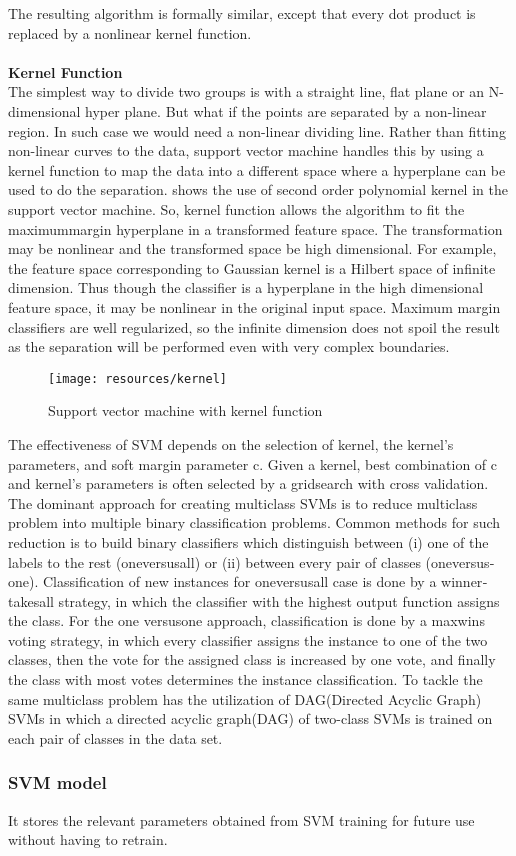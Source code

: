 The resulting algorithm is formally similar, except that every dot product is replaced by a nonlinear kernel 
function.\\
\\
\textbf{Kernel Function}\\
The simplest way to divide two groups is with a straight line, flat plane or an N-dimensional hyper plane.
But what if the points are separated by a non-linear region. In such case we would need a non-linear dividing line. Rather than fitting
non-linear curves to the data, support vector machine handles this by using a kernel function to map the data into a different space where
a hyperplane can be used to do the separation. \cite{Anglade2010} shows the use of second order polynomial kernel in the support vector machine.
So, kernel function allows the algorithm to fit the maximum­margin hyperplane in a transformed
feature space. The transformation may be nonlinear and the transformed space be high dimensional. For example, the 
feature space corresponding to Gaussian kernel is a Hilbert space of infinite dimension. Thus though the 
classifier is a hyperplane in the high dimensional feature space, it may be nonlinear in the original input 
space. Maximum margin classifiers are well regularized, so the infinite dimension does not spoil the 
result as the separation will be performed even with very complex boundaries.\\

\begin{figure}[h!]
        \texttt{[image: resources/kernel]}
        \caption{Support vector machine with kernel function}
\end{figure}
\vspace{15mm}
The effectiveness of SVM depends on the selection of kernel, the kernel’s parameters, and soft 
margin parameter c. Given a kernel, best combination of c and kernel’s parameters is often selected by a 
grid­search with cross validation. 
The dominant approach for creating multiclass SVMs is to reduce multi­class problem into 
multiple binary classification problems. Common methods for such reduction is to build binary classifiers 
which distinguish between (i) one of the labels to the rest (one­versus­all) or (ii) between every pair of 
classes (one­versus­one). Classification of new instances for one­versus­all case is done by a 
winner­takes­all strategy, in which the classifier with the highest output function assigns the class. For the 
one ­versus­one approach, classification is done by a max­wins voting strategy, in which every classifier 
assigns the instance to one of the two classes, then the vote for the assigned class is increased by one vote, 
and finally the class with most votes determines the instance classification. To tackle the same multiclass problem \cite{Haggblade2011} has the  
utilization of DAG(Directed Acyclic Graph) SVMs in which a directed acyclic graph(DAG) of two-class SVMs is trained on each pair of classes in the data set.

\subsubsection{SVM model}
It stores the relevant parameters obtained from SVM training for future use without having to retrain.

